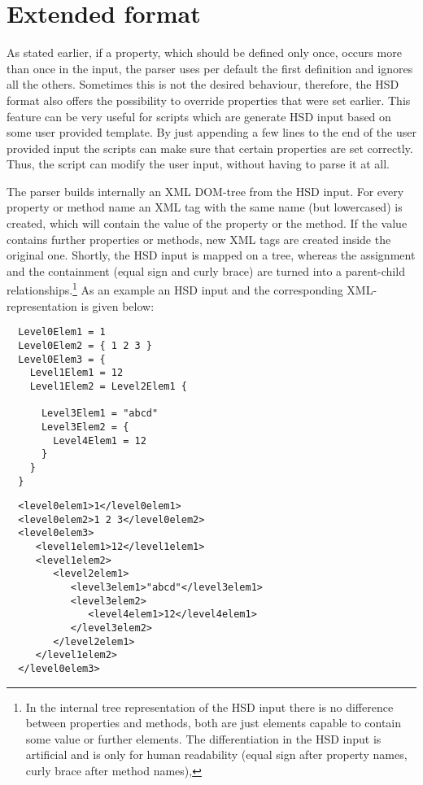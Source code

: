 \section{Extended format}
\label{sec:hsdext}

As stated earlier, if a property, which should be defined only once,
occurs more than once in the input, the parser uses per default the
first definition and ignores all the others. Sometimes this is not the
desired behaviour, therefore, the HSD format also offers the
possibility to override properties that were set earlier.  This
feature can be very useful for scripts which are generate HSD input
based on some user provided template.  By just appending a few lines
to the end of the user provided input the scripts can make sure that
certain properties are set correctly. Thus, the script can modify the
user input, without having to parse it at all.

The parser builds internally an XML DOM-tree from the HSD input. For
every property or method name an XML tag with the same name (but
lowercased) is created, which will contain the value of the property
or the method. If the value contains further properties or methods,
new XML tags are created inside the original one. Shortly, the HSD
input is mapped on a tree, whereas the assignment and the containment
(equal sign and curly brace) are turned into a parent-child
relationships.\footnote{In the internal tree representation of the HSD
  input there is no difference between properties and methods, both
  are just elements capable to contain some value or further
  elements. The differentiation in the HSD input is artificial and is
  only for human readability (equal sign after property names, curly
  brace after method names),} As an example an HSD input and the
corresponding XML-representation is given below:

\begin{minipage}{1.0\linewidth}
  \begin{center}
    \begin{minipage}[t]{5.5cm}
\begin{verbatim}
  Level0Elem1 = 1
  Level0Elem2 = { 1 2 3 }
  Level0Elem3 = {
    Level1Elem1 = 12
    Level1Elem2 = Level2Elem1 {

      Level3Elem1 = "abcd"
      Level3Elem2 = {
        Level4Elem1 = 12
      }
    }
  }
\end{verbatim}
    \end{minipage}
    \hspace*{1cm}
    \begin{minipage}[t]{7.5cm}
\begin{verbatim}
  <level0elem1>1</level0elem1>
  <level0elem2>1 2 3</level0elem2>
  <level0elem3>
     <level1elem1>12</level1elem1>
     <level1elem2>
        <level2elem1>
           <level3elem1>"abcd"</level3elem1>
           <level3elem2>
              <level4elem1>12</level4elem1>
           </level3elem2>
        </level2elem1>
     </level1elem2>
  </level0elem3>
\end{verbatim}    
    \end{minipage}
  \end{center}
\end{minipage}


